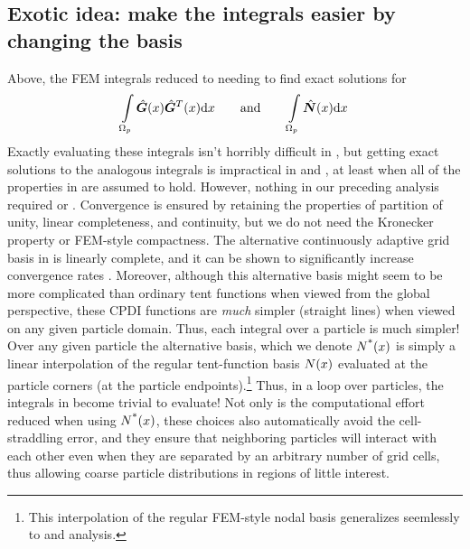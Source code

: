 \subsection{Exotic idea: make the integrals easier by changing the basis}
Above, the FEM integrals reduced to needing to find exact solutions for 
\begin{equation}
\int\limits_{\Omega_p} \hat{\bm{G}}(x)\hat{\bm{G}}^T(x) \mathrm{d} x
\qquad\text{and}\qquad
\int\limits_{\Omega_p} \hat{\bm{N}}(x) \mathrm{d} x
\label{eq:LinearBarBasisIntegrals}
\end{equation}
Exactly evaluating these integrals isn't horribly difficult in \oneD, but getting exact solutions to the analogous integrals is impractical in \twoD and \threeD, at least when all of the properties in   are assumed to hold. However, nothing in our preceding analysis required  or . Convergence is ensured by retaining the properties of partition of unity,  linear completeness, and continuity, but we do not need the Kronecker property or FEM-style compactness. The alternative continuously adaptive grid basis in  is linearly complete, and it can be shown to significantly increase convergence rates \cite{Sadeghirad2011}.  Moreover, although this alternative basis might seem to be more complicated than ordinary tent functions when viewed from the global perspective, these CPDI functions are \emph{much} simpler (straight lines) when viewed on any given particle domain. Thus, each integral over a particle is much simpler!  Over any given particle the alternative basis, which we denote ${N}^{\text{*}}(x)$ is simply a linear interpolation of the regular tent-function basis ${N}(x)$ evaluated at the particle corners (\ie at the particle endpoints).\footnote{This interpolation of the regular FEM-style nodal basis generalizes seemlessly to \twoD and \threeD analysis.}  Thus, in a loop over particles, the integrals in  become trivial to evaluate!  Not only is the computational effort reduced when using ${N}^{\text{*}}(x)$, these choices also automatically avoid the cell-straddling error, and they ensure that neighboring particles will interact with each other even when they are separated by an arbitrary number of grid cells, thus allowing coarse particle distributions in regions of little interest.


